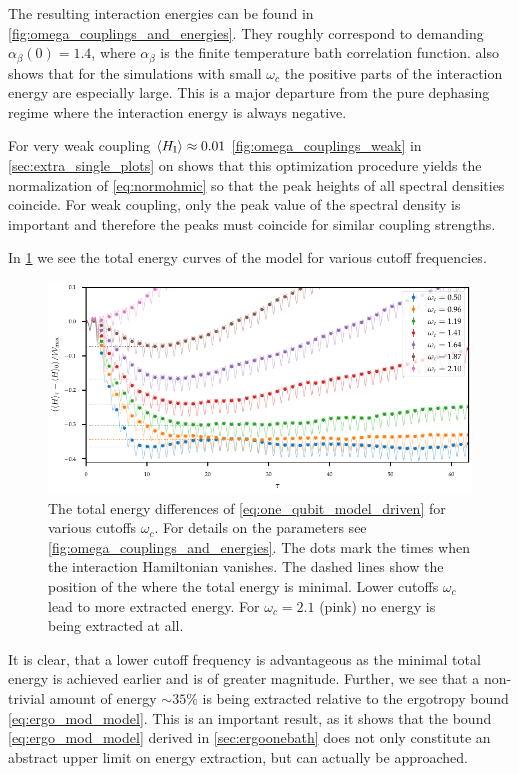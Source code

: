 The resulting interaction energies can be found in
\cref{fig:omega_couplings_and_energies}. They roughly correspond to
demanding \(α_{β}(0)=1.4\), where \(α_{β}\) is the finite temperature
bath correlation function.  
also shows that for the simulations with small \(ω_{c}\) the positive
parts of the interaction energy are especially large. This is a major
departure from the pure dephasing regime where the interaction energy
is always negative.

For very weak coupling \(\ev{H_{\inter}}\approx 0.01\)
\cref{fig:omega_couplings_weak} in \cref{sec:extra_single_plots} on
 shows that this optimization
procedure yields the normalization of \cref{eq:normohmic} so that the
peak heights of all spectral densities coincide. For weak coupling,
only the peak value of the spectral density is important and therefore
the peaks must coincide for similar coupling strengths.

In \cref{fig:omegas_total} we see the total energy curves of the model
for various cutoff frequencies.
\begin{figure}[htp]
  \centering
  \includegraphics{figs/one_bath_mod/omegas_total}
  \caption{\label{fig:omegas_total} The total energy differences of
    \cref{eq:one_qubit_model_driven} for various cutoffs
    \(ω_{c}\). For details on the parameters see
    \cref{fig:omega_couplings_and_energies}. The dots mark the times
    when the interaction Hamiltonian vanishes.  The dashed lines show the
    position of the where the total energy is minimal. Lower cutoffs
    \(ω_{c}\) lead to more extracted energy. For \(ω_{c}=2.1\) (pink) no
    energy is being extracted at all.}
\end{figure}
It is clear, that a lower cutoff frequency is advantageous as the
minimal total energy is achieved earlier and is of greater
magnitude. Further, we see that a non-trivial amount of energy
\(\sim 35\%\) is being extracted relative to the ergotropy bound
\cref{eq:ergo_mod_model}. This is an important result, as it shows
that the bound \cref{eq:ergo_mod_model} derived in
\cref{sec:ergoonebath} does not only constitute an abstract upper
limit on energy extraction, but can actually be approached.

